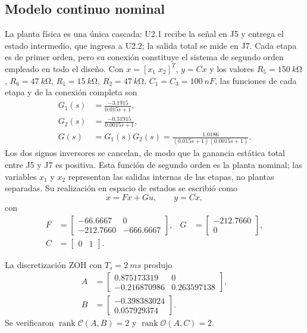 \documentclass[conference]{IEEEtran}
\begin{document}
\subsection{Modelo continuo nominal}
La planta física es una única cascada: U2.1 recibe la señal en J5 y entrega el estado intermedio, que ingresa a U2.2; la salida total se mide en J7. Cada etapa es de primer orden, pero su conexión constituye el sistema de segundo orden empleado en todo el diseño. Con $x=[x_1\;x_2]^T$, $y=Cx$ y los valores $R_5=\SI{150}{k\ohm}$, $R_6=\SI{47}{k\ohm}$, $R_1=\SI{15}{k\ohm}$, $R_2=\SI{47}{k\ohm}$, $C_1=C_3=\SI{100}{nF}$, las funciones de cada etapa y de la conexión completa son
\begin{align}
G_1(s)&=\frac{-3.1915}{0.015s+1},\\
G_2(s)&=\frac{-0.31915}{0.0015s+1},\\
G(s)&=G_1(s)G_2(s)
=\frac{1.0186}{(0.015s+1)(0.0015s+1)}.
\end{align}
Los dos signos inversores se cancelan, de modo que la ganancia estática total
entre J5 y J7 es positiva. Esta función de segundo orden es la planta nominal;
las variables $x_1$ y $x_2$ representan las salidas internas de las etapas, no
plantas separadas. Su realización en espacio de estados se escribió como
\begin{equation}
\dot{x}=Fx+Gu,\qquad y=Cx,
\end{equation}
con
\begin{align}
F&=\begin{bmatrix}
-66.6667&0\\
-212.7660&-666.6667
\end{bmatrix},
&G&=\begin{bmatrix}-212.7660\\0\end{bmatrix},\\
C&=\begin{bmatrix}0&1\end{bmatrix}.
\end{align}

La discretización ZOH con $T_s=\SI{2}{ms}$ produjo
\begin{align}
A&=\begin{bmatrix}
0.875173319&0\\
-0.216870986&0.263597138
\end{bmatrix},\\
B&=\begin{bmatrix}-0.398383024\\0.057929374\end{bmatrix}.
\end{align}
Se verificaron $\operatorname{rank}\mathcal{C}(A,B)=2$ y $\operatorname{rank}\mathcal{O}(A,C)=2$.
\end{document}
